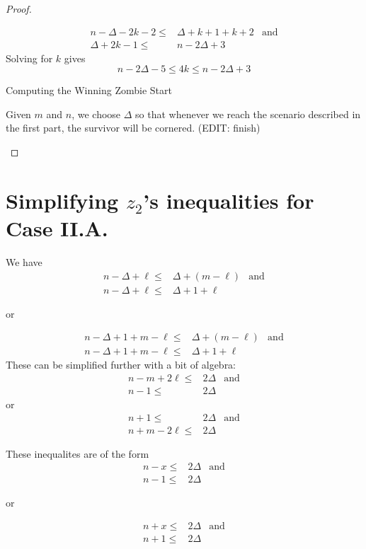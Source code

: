 \documentclass[letterpaper, 10pt]{article}
\begin{document}
\begin{proof}
\begin{proofpart}
  \begin{align*}
   n - \Delta - 2k - 2 \leq & \Delta + k +1 + k +2 & \text{and} \\
   \Delta + 2k -1 \leq      & n - 2\Delta +3
  \end{align*}
  Solving for $k$ gives
  \[ n - 2\Delta -5 \leq 4k \leq n-2\Delta +3 \]

 \end{proofpart}

 \begin{proofpart} Computing the Winning Zombie Start

  Given $m$ and $n$, we choose $\Delta$ so that whenever we reach
  the scenario described in the first part, the survivor will be cornered.
  (EDIT: finish)
 \end{proofpart}
\end{proof}

\newpage
\appendix
\section{Simplifying $z_2$'s inequalities for Case II.A.}
We have
\begin{align*}
 n - \Delta + \ell \leq & \Delta + (m - \ell) & \text{and} \\
 n - \Delta + \ell \leq & \Delta + 1 + \ell
\end{align*}
\begin{center}or\end{center}
\begin{align*}
 n - \Delta + 1 + m - \ell \leq & \Delta + (m - \ell) & \text{and} \\
 n - \Delta + 1 + m - \ell \leq & \Delta + 1 + \ell
\end{align*}
These can be simplified further with a bit of algebra:
\begin{align*}
 n-m +2\ell \leq & 2 \Delta & \text{and} \\
 n-1 \leq        & 2\Delta
\end{align*}
or
\begin{align*}
 n + 1 \leq         & 2 \Delta & \text{and} \\
 n + m - 2\ell \leq & 2 \Delta
\end{align*}

These inequalites are of the form
\begin{align*}
 n-x \leq & 2 \Delta & \text{and} \\
 n-1 \leq & 2\Delta
\end{align*}
\begin{center}or\end{center}
\begin{align*}
 n + x \leq & 2 \Delta & \text{and} \\
 n + 1 \leq & 2 \Delta
\end{align*}
\end{document}
